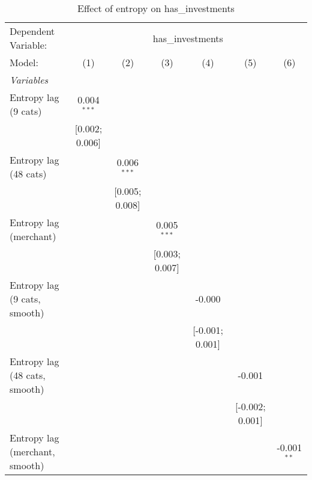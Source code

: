 
\begin{table}[htbp]
   \centering
   \tiny
   \begin{threeparttable}[b]
      \caption{\label{tab:reg_has_investments_lag_cnz} Effect of entropy on has\_investments}
      \begin{tabular}{lcccccc}
         \tabularnewline \midrule \midrule
         Dependent Variable: & \multicolumn{6}{c}{has\_investments}\\
         Model:                         & (1)            & (2)            & (3)            & (4)             & (5)             & (6)\\  
         \midrule
         \emph{Variables}\\
         Entropy lag (9 cats)           & 0.004$^{***}$  &                &                &                 &                 &   \\   
                                        & [0.002; 0.006] &                &                &                 &                 &   \\   
         Entropy lag (48 cats)          &                & 0.006$^{***}$  &                &                 &                 &   \\   
                                        &                & [0.005; 0.008] &                &                 &                 &   \\   
         Entropy lag (merchant)         &                &                & 0.005$^{***}$  &                 &                 &   \\   
                                        &                &                & [0.003; 0.007] &                 &                 &   \\   
         Entropy lag (9 cats, smooth)   &                &                &                & -0.000          &                 &   \\   
                                        &                &                &                & [-0.001; 0.001] &                 &   \\   
         Entropy lag (48 cats, smooth)  &                &                &                &                 & -0.001          &   \\   
                                        &                &                &                &                 & [-0.002; 0.001] &   \\   
         Entropy lag (merchant, smooth) &                &                &                &                 &                 & -0.001$^{**}$\\   

\end{tabular}
\end{threeparttable}
\end{table}
